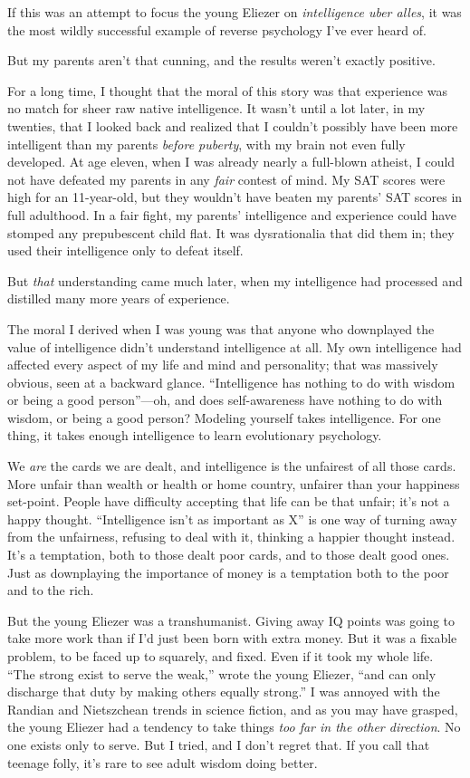 {
 If this was an attempt to focus the young Eliezer on
\textit{intelligence uber alles}, it was the most wildly successful
example of reverse psychology I've ever heard of.}

{
 But my parents aren't that cunning, and the
results weren't exactly positive.}

{
 For a long time, I thought that the moral of this story was that
experience was no match for sheer raw native intelligence. It
wasn't until a lot later, in my twenties, that I looked
back and realized that I couldn't possibly have been
more intelligent than my parents \textit{before puberty}, with my brain
not even fully developed. At age eleven, when I was already nearly a
full-blown atheist, I could not have defeated my parents in any
\textit{fair} contest of mind. My SAT scores were high for an
11-year-old, but they wouldn't have beaten my
parents' SAT scores in full adulthood. In a fair fight,
my parents' intelligence and experience could have
stomped any prepubescent child flat. It was dysrationalia that did them
in; they used their intelligence only to defeat itself.}

{
 But \textit{that} understanding came much later, when my
intelligence had processed and distilled many more years of
experience.}

{
 The moral I derived when I was young was that anyone who
downplayed the value of intelligence didn't understand
intelligence at all. My own intelligence had affected every aspect of
my life and mind and personality; that was massively obvious, seen at a
backward glance. ``Intelligence has nothing to do with
wisdom or being a good person''---oh, and does
self-awareness have nothing to do with wisdom, or being a good person?
Modeling yourself takes intelligence. For one thing, it takes enough
intelligence to learn evolutionary psychology.}

{
 We \textit{are} the cards we are dealt, and intelligence is the
unfairest of all those cards. More unfair than wealth or health or home
country, unfairer than your happiness set-point. People have difficulty
accepting that life can be that unfair; it's not a
happy thought. ``Intelligence isn't as
important as X'' is one way of turning away from the
unfairness, refusing to deal with it, thinking a happier thought
instead. It's a temptation, both to those dealt poor
cards, and to those dealt good ones. Just as downplaying the importance
of money is a temptation both to the poor and to the rich.}

{
 But the young Eliezer was a transhumanist. Giving away IQ points
was going to take more work than if I'd just been born
with extra money. But it was a fixable problem, to be faced up to
squarely, and fixed. Even if it took my whole life.
``The strong exist to serve the
weak,'' wrote the young Eliezer,
``and can only discharge that duty by making others
equally strong.'' I was annoyed with the Randian and
Nietszchean trends in science fiction, and as you may have grasped, the
young Eliezer had a tendency to take things \textit{too far in the
other direction}. No one exists only to serve. But I tried, and I
don't regret that. If you call that teenage folly,
it's rare to see adult wisdom doing better.}


